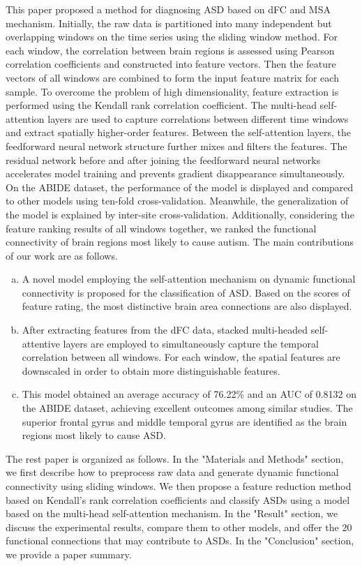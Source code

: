 \documentclass[a4paper]{cas-dc}
\begin{document}
This paper proposed a method for diagnosing ASD based on dFC and MSA mechanism. Initially, the raw data is partitioned into many independent but overlapping  windows on the time series using the sliding window method. For each window, the correlation between brain regions is assessed using Pearson correlation coefficients and constructed into feature vectors. Then the feature vectors of all windows are combined to form the input feature matrix for each sample. To overcome the problem of high dimensionality, feature extraction is performed using the Kendall rank correlation coefficient. The multi-head self-attention layers are used to capture correlations between different time windows and extract spatially higher-order features. Between the self-attention layers, the feedforward neural network structure further mixes and filters the features. The residual network before and after joining the feedforward neural networks accelerates model training and prevents gradient disappearance simultaneously. On the ABIDE dataset, the performance of the model is displayed and compared to other models using ten-fold cross-validation. Meanwhile, the generalization of the model is explained by inter-site cross-validation. Additionally, considering the feature ranking results of all windows together, we ranked the functional connectivity of brain regions most likely to cause autism. The main contributions of our work are as follows.
\begin{enumerate}[a)]
	\item A novel model employing the self-attention mechanism on dynamic functional connectivity is proposed for the classification of ASD. Based on the scores of feature rating, the most distinctive brain area connections are also displayed.
	\item After extracting features from the dFC data, stacked multi-headed self-attentive layers are employed to simultaneously capture the temporal correlation between all windows. For each window, the spatial features are downscaled in order to obtain more distinguishable features.
	\item This model obtained an average accuracy of 76.22\% and an AUC of 0.8132 on the ABIDE dataset, achieving excellent outcomes among similar studies. The superior frontal gyrus and middle temporal gyrus are identified as the brain regions most likely to cause ASD.
\end{enumerate}  

The rest paper is organized as follows. In the "Materials and Methods" section, we first describe how to preprocess raw data and generate dynamic functional connectivity using sliding windows. We then propose a feature reduction method based on Kendall's rank correlation coefficients and classify ASDs using a model based on the multi-head self-attention mechanism. In the "Result" section, we discuss the experimental results, compare them to other models, and offer the 20 functional connections that may contribute to ASDs. In the "Conclusion" section, we provide a paper summary.
\end{document}

